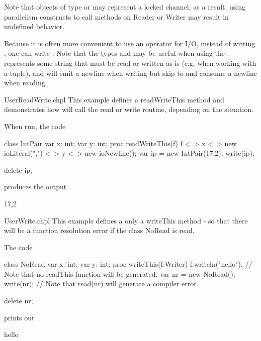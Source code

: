 Note that objects of type  or  may represent a locked channel; as a result, using parallelism constructs to call methods on Reader or Writer may result in undefined behavior.

Because it is often more convenient to use an operator for I/O, instead of writing , one can write . Note that the types  and  may be useful when using the \chpl{<~>}.  represents some string that must be read or written as-is (e.g.  when working with a tuple), and  will emit a newline when writing but skip to and consume a newline when reading.

\begin{chapelexample}{UserReadWrite.chpl}
This example defines a readWriteThis method and demonstrates how \chpl{<~>} will
call the read or write routine, depending on the situation.

When run, the code
\begin{chapel}
class IntPair {
  var x: int;
  var y: int;
  proc readWriteThis(f) {
    f <~> x <~> new ioLiteral(",") <~> y <~> new ioNewline();
  }
}
var ip = new IntPair(17,2);
write(ip);
\end{chapel}
\begin{chapelpost}
delete ip;
\end{chapelpost}
produces the output
\begin{chapelprintoutput}{}
17,2
\end{chapelprintoutput}
\end{chapelexample}

\begin{chapelexample}{UserWrite.chpl}
This example defines a only a writeThis method - so that there will be a function resolution error if the class NoRead is read.

The code
\begin{chapel}
class NoRead {
  var x: int;
  var y: int;
  proc writeThis(f:Writer) {
    f.writeln("hello");
  }
  // Note that no readThis function will be generated.
}
var nr = new NoRead();
write(nr);
// Note that read(nr) will generate a compiler error.
\end{chapel}
\begin{chapelpost}
delete nr;
\end{chapelpost}
prints out
\begin{chapelprintoutput}{}
hello
\end{chapelprintoutput}
\end{chapelexample}


